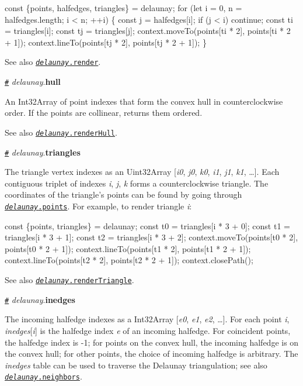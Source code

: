\begin{DoxyCode}
const \{points, halfedges, triangles\} = delaunay;
for (let i = 0, n = halfedges.length; i < n; ++i) \{
  const j = halfedges[i];
  if (j < i) continue;
  const ti = triangles[i];
  const tj = triangles[j];
  context.moveTo(points[ti * 2], points[ti * 2 + 1]);
  context.lineTo(points[tj * 2], points[tj * 2 + 1]);
\}
\end{DoxyCode}


See also \href{#delaunay_render}{\tt {\itshape delaunay}.render}.

\href{#delaunay_hull}{\tt \#} {\itshape delaunay}.{\bfseries hull}

An Int32\+Array of point indexes that form the convex hull in counterclockwise order. If the points are collinear, returns them ordered.

See also \href{#delaunay_renderHull}{\tt {\itshape delaunay}.render\+Hull}.

\href{#delaunay_triangles}{\tt \#} {\itshape delaunay}.{\bfseries triangles}

The triangle vertex indexes as an Uint32\+Array \mbox{[}{\itshape i0}, {\itshape j0}, {\itshape k0}, {\itshape i1}, {\itshape j1}, {\itshape k1}, …\mbox{]}. Each contiguous triplet of indexes {\itshape i}, {\itshape j}, {\itshape k} forms a counterclockwise triangle. The coordinates of the triangle’s points can be found by going through \href{#delaunay_points}{\tt {\itshape delaunay}.points}. For example, to render triangle {\itshape i}\+:


\begin{DoxyCode}
const \{points, triangles\} = delaunay;
const t0 = triangles[i * 3 + 0];
const t1 = triangles[i * 3 + 1];
const t2 = triangles[i * 3 + 2];
context.moveTo(points[t0 * 2], points[t0 * 2 + 1]);
context.lineTo(points[t1 * 2], points[t1 * 2 + 1]);
context.lineTo(points[t2 * 2], points[t2 * 2 + 1]);
context.closePath();
\end{DoxyCode}


See also \href{#delaunay_renderTriangle}{\tt {\itshape delaunay}.render\+Triangle}.

\href{#delaunay_inedges}{\tt \#} {\itshape delaunay}.{\bfseries inedges}

The incoming halfedge indexes as a Int32\+Array \mbox{[}{\itshape e0}, {\itshape e1}, {\itshape e2}, …\mbox{]}. For each point {\itshape i}, {\itshape inedges}\mbox{[}{\itshape i}\mbox{]} is the halfedge index {\itshape e} of an incoming halfedge. For coincident points, the halfedge index is -\/1; for points on the convex hull, the incoming halfedge is on the convex hull; for other points, the choice of incoming halfedge is arbitrary. The {\itshape inedges} table can be used to traverse the Delaunay triangulation; see also \href{#delaunay_neighbors}{\tt {\itshape delaunay}.neighbors}.

